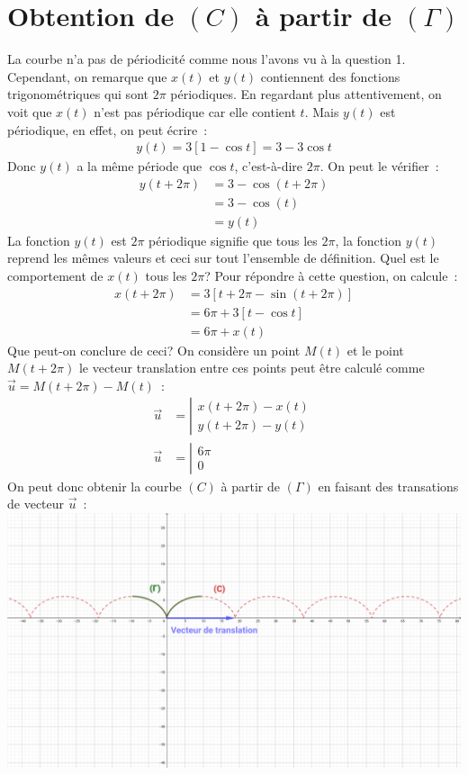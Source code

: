 \documentclass{article}
\begin{document}
\section{Obtention de $(C)$ à partir de $(\Gamma)$}
La courbe n'a pas de périodicité comme nous l'avons vu à la question 1.
Cependant, on remarque que $x(t)$ et $y(t)$ contiennent des fonctions trigonométriques qui sont
$2\pi$ périodiques.
En regardant plus attentivement, on voit que $x(t)$ n'est pas périodique car elle contient
$t$.
Mais $y(t)$ est périodique, en effet, on peut écrire~:
\begin{align*}
        y(t) = 3[1-\cos t] = 3 - 3\cos t
\end{align*}
Donc $y(t)$ a la même période que $\cos t$, c'est-à-dire $2\pi$.
On peut le vérifier~:
\begin{align*}
        y(t+2\pi) &= 3-\cos (t+2\pi)\\
                  &= 3-\cos(t)\\
                  &= y(t)
\end{align*}
La fonction $y(t)$ est $2\pi$ périodique signifie que tous les $2\pi$, la fonction $y(t)$
reprend les mêmes valeurs et ceci sur tout l'ensemble de définition.
Quel est le comportement de $x(t)$ tous les $2\pi$?
Pour répondre à cette question, on calcule~:
\begin{align*}
        x(t+2\pi) &= 3[t+2\pi-\sin(t+2\pi)]\\
                  &= 6\pi+3[t-\cos t]\\
                  &= 6\pi+x(t)
\end{align*}
Que peut-on conclure de ceci?
On considère un point $M(t)$ et le point $M(t+2\pi)$ le vecteur translation entre
ces points peut être calculé comme $\vec{u}=M(t+2\pi)-M(t)$~:
\begin{align*}
        \vec{u}&=\left|\begin{array}{l}x(t+2\pi)-x(t)\\y(t+2\pi)-y(t)\end{array}\right.\\
        \vec{u}&=\left|\begin{array}{l}6\pi\\0\end{array}\right.
\end{align*}
On peut donc obtenir la courbe $(C)$ à partir de $(\Gamma)$ en faisant des transations
de vecteur $\vec{u}$~:\\
\includegraphics[width=\textwidth]{images/td4ex1q2.png}
\end{document}
